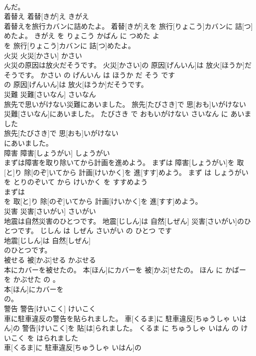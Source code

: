 \documentclass[8pt]{extreport}
\begin{document}
\begin{CJK}{UTF8}{min}
\\	んだ。			
\\	着替え	着替[きが]え	きがえ	
\\	着替えを旅行カバンに詰めたよ。	着替[きが]えを 旅行[りょこう]カバンに 詰[つ]めたよ。	きがえ を りょこう かばん に つめた よ	
\\	を 旅行[りょこう]カバンに 詰[つ]めたよ。			
\\	火災	火災[かさい]	かさい	
\\	火災の原因は放火だそうです。	火災[かさい]の 原因[げんいん]は 放火[ほうか]だそうです。	かさい の げんいん は ほうか だ そう です	
\\	の 原因[げんいん]は 放火[ほうか]だそうです。			
\\	災難	災難[さいなん]	さいなん	
\\	旅先で思いがけない災難にあいました。	旅先[たびさき]で 思[おも]いがけない 災難[さいなん]にあいました。	たびさき で おもいがけない さいなん に あいました	
\\	旅先[たびさき]で 思[おも]いがけない
\\	にあいました。			
\\	障害	障害[しょうがい]	しょうがい	
\\	まずは障害を取り除いてから計画を進めよう。	まずは 障害[しょうがい]を 取[と]り 除[のぞ]いてから 計画[けいかく]を 進[すす]めよう。	まず は しょうがい を とりのぞいて から けいかく を すすめよう	
\\	まずは
\\	を 取[と]り 除[のぞ]いてから 計画[けいかく]を 進[すす]めよう。			
\\	災害	災害[さいがい]	さいがい	
\\	地震は自然災害のひとつです。	地震[じしん]は 自然[しぜん] 災害[さいがい]のひとつです。	じしん は しぜん さいがい の ひとつ です	
\\	地震[じしん]は 自然[しぜん]
\\	のひとつです。			
\\	被せる	被[かぶ]せる	かぶせる	
\\	本にカバーを被せたの。	本[ほん]にカバーを 被[かぶ]せたの。	ほん に かばー を かぶせた の 。	
\\	本[ほん]にカバーを
\\	の。			
\\	警告	警告[けいこく]	けいこく	
\\	車に駐車違反の警告を貼られました。	車[くるま]に 駐車違反[ちゅうしゃ いはん]の 警告[けいこく]を 貼[は]られました。	くるま に ちゅうしゃ いはん の けいこく を はられました	
\\	車[くるま]に 駐車違反[ちゅうしゃ いはん]の

\end{CJK}
\end{document}
